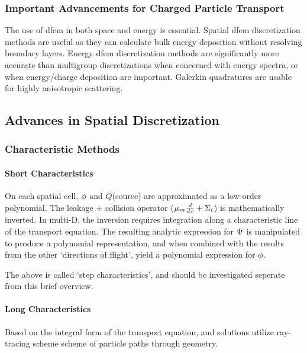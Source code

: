 \subsubsection{Important Advancements for Charged Particle Transport}
The use of \gls{dfem} in both space and energy is essential. Spatial \gls{dfem} discretization methods are useful as they can calculate bulk energy deposition without resolving boundary layers. Energy \gls{dfem} discretization methods are significantly more accurate than multigroup discretizations when concerned with energy spectra, or when energy/charge deposition are important. Galerkin quadratures are usable for highly anisotropic scattering.

\subsection{Advances in Spatial Discretization}
\subsubsection{Characteristic Methods}
\paragraph{Short Characteristics}
On each spatial cell, $\mathrm{\phi}$ and $Q$(source) are approximated as a low-order polynomial. The leakage + collision operator ($\mu_m\frac{d}{dx}+\Sigma_{t}$) is mathematically inverted. In multi-D, the inversion requires integration along a characteristic line of the transport equation. The resulting analytic expression for $\Psi$ is manipulated to produce a polynomial representation, and when combined with the results from the other `directions of flight', yield a polynomial expression for $\mathrm{\phi}$. 

The above is called `step characteristics', and should be investigated seperate from this brief overview.  
\paragraph{Long Characteristics}
Based on the integral form of the transport equation, and solutions utilize ray-tracing scheme scheme of particle paths through geometry. 

